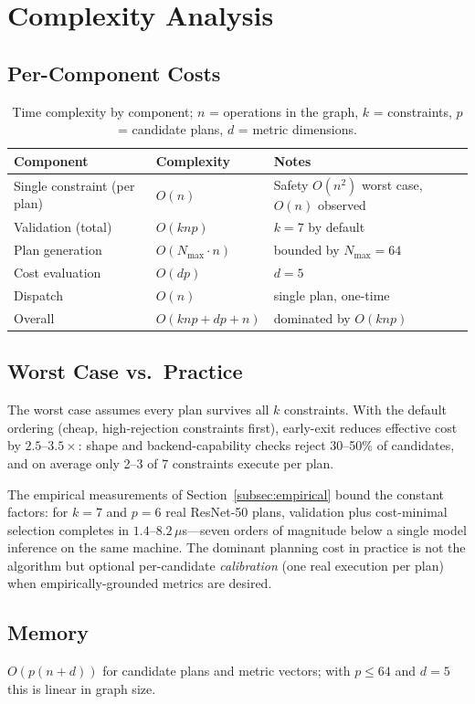 \section{Complexity Analysis}
\label{sec:complexity}

\subsection{Per-Component Costs}

\begin{table}[H]
\centering
\small
\caption{Time complexity by component; $n$ = operations in the graph,
$k$ = constraints, $p$ = candidate plans, $d$ = metric dimensions.}
\label{tab:complexity}
\begin{tabular}{@{}lll@{}}
\toprule
Component & Complexity & Notes \\
\midrule
Single constraint (per plan) & $O(n)$ & Safety $O(n^2)$ worst case, $O(n)$ observed \\
Validation (total) & $O(knp)$ & $k = 7$ by default \\
Plan generation & $O(N_{\max} \cdot n)$ & bounded by $N_{\max} = 64$ \\
Cost evaluation & $O(dp)$ & $d = 5$ \\
Dispatch & $O(n)$ & single plan, one-time \\
\midrule
Overall & $O(knp + dp + n)$ & dominated by $O(knp)$ \\
\bottomrule
\end{tabular}
\end{table}

\subsection{Worst Case vs.\ Practice}

The worst case assumes every plan survives all $k$ constraints. With
the default ordering (cheap, high-rejection constraints first),
early-exit reduces effective cost by $2.5$--$3.5\times$: shape and
backend-capability checks reject 30--50\% of candidates, and on average
only 2--3 of 7 constraints execute per plan.

The empirical measurements of Section~\ref{subsec:empirical} bound the
constant factors: for $k = 7$ and $p = 6$ real ResNet-50 plans,
validation plus cost-minimal selection completes in
$1.4$--$8.2\,\mu$s---seven orders of magnitude below a single model
inference on the same machine. The dominant planning cost in practice
is not the algorithm but optional per-candidate \emph{calibration}
(one real execution per plan) when empirically-grounded metrics are
desired.

\subsection{Memory}

$O(p(n + d))$ for candidate plans and metric vectors; with $p \leq 64$
and $d = 5$ this is linear in graph size.
